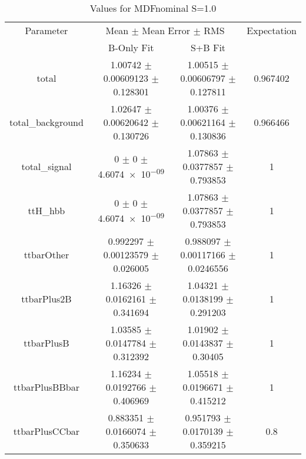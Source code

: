 \begin{table}
\centering
\caption{Values for MDFnominal S=1.0}
\begin{tabular}{cccc}
\toprule
Parameter & \multicolumn{2}{c}{Mean $\pm$ Mean Error $\pm$ RMS} & Expectation\\
 & B-Only Fit & S+B Fit & \\
\midrule
total & \num{1.00742} $\pm$ \num{0.00609123} $\pm$ \num{0.128301} & \num{1.00515} $\pm$ \num{0.00606797} $\pm$ \num{0.127811} & \num{0.967402}\\
total\_background & \num{1.02647} $\pm$ \num{0.00620642} $\pm$ \num{0.130726} & \num{1.00376} $\pm$ \num{0.00621164} $\pm$ \num{0.130836} & \num{0.966466}\\
total\_signal & \num{0} $\pm$ \num{0} $\pm$ \num{4.6074e-09} & \num{1.07863} $\pm$ \num{0.0377857} $\pm$ \num{0.793853} & \num{1}\\
ttH\_hbb & \num{0} $\pm$ \num{0} $\pm$ \num{4.6074e-09} & \num{1.07863} $\pm$ \num{0.0377857} $\pm$ \num{0.793853} & \num{1}\\
ttbarOther & \num{0.992297} $\pm$ \num{0.00123579} $\pm$ \num{0.026005} & \num{0.988097} $\pm$ \num{0.00117166} $\pm$ \num{0.0246556} & \num{1}\\
ttbarPlus2B & \num{1.16326} $\pm$ \num{0.0162161} $\pm$ \num{0.341694} & \num{1.04321} $\pm$ \num{0.0138199} $\pm$ \num{0.291203} & \num{1}\\
ttbarPlusB & \num{1.03585} $\pm$ \num{0.0147784} $\pm$ \num{0.312392} & \num{1.01902} $\pm$ \num{0.0143837} $\pm$ \num{0.30405} & \num{1}\\
ttbarPlusBBbar & \num{1.16234} $\pm$ \num{0.0192766} $\pm$ \num{0.406969} & \num{1.05518} $\pm$ \num{0.0196671} $\pm$ \num{0.415212} & \num{1}\\
ttbarPlusCCbar & \num{0.883351} $\pm$ \num{0.0166074} $\pm$ \num{0.350633} & \num{0.951793} $\pm$ \num{0.0170139} $\pm$ \num{0.359215} & \num{0.8}\\
\bottomrule
\end{tabular}
\end{table}